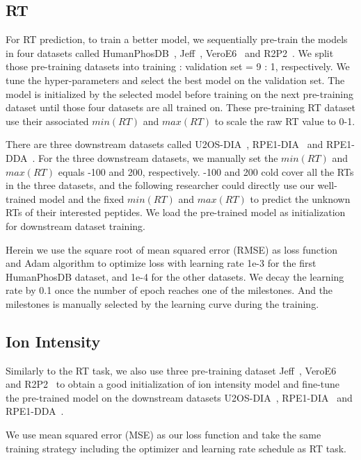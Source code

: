 \subsection{RT}
For RT prediction, to train a better model, we sequentially pre-train the models in four datasets called 
HumanPhosDB~\cite{lawrence2016plug}, Jeff~\cite{liu2018vivo}, VeroE6~\cite{bouhaddou2020global}
and R2P2~\cite{leutert2019r2}. We split those pre-training datasets into training : validation set = 9 : 1, respectively. We tune the hyper-parameters and select the best model on the validation set. The model is initialized by the selected model before training on the next pre-training dataset until those four datasets are all trained on. These pre-training RT dataset use their associated $min(RT)$ and $max(RT)$ to scale the raw RT value to 0-1. 

There are three downstream datasets called U2OS-DIA~\cite{wang2020naguider}, RPE1-DIA~\cite{bekker2020rapid} and RPE1-DDA~\cite{bekker2020rapid}. For the three downstream datasets, we manually set the $min(RT)$ and $max(RT)$ equals -100 and 200, respectively. -100 and 200 cold cover all the RTs in the three datasets, and the following researcher could directly use our well-trained model and the fixed $min(RT)$ and $max(RT)$ to predict the unknown RTs of their interested peptides. We load the pre-trained model as initialization for downstream dataset training. 

Herein we use the square root of mean squared error (RMSE) as loss function and Adam algorithm to optimize loss with learning rate 1e-3 for the first HumanPhosDB dataset, and 1e-4 for the other datasets. We decay the learning rate by 0.1 once the number of epoch reaches one of the milestones. And the milestones is manually selected by the learning curve during the training.

\subsection{Ion Intensity}
Similarly to the RT task, we also use three pre-training dataset Jeff~\cite{liu2018vivo}, VeroE6~\cite{bouhaddou2020global} and R2P2~\cite{leutert2019r2} to obtain a good initialization of ion intensity model and fine-tune the pre-trained model on the downstream datasets U2OS-DIA~\cite{wang2020naguider}, RPE1-DIA~\cite{bekker2020rapid} and RPE1-DDA~\cite{bekker2020rapid}. 

We use mean squared error (MSE) as our loss function and take the same training strategy including the optimizer and learning rate schedule as RT task.
